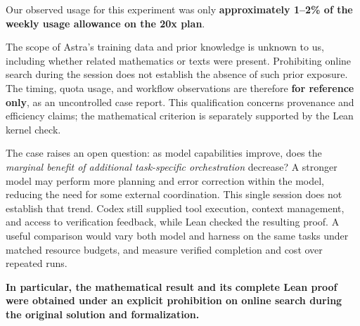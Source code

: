 \documentclass[11pt,a4paper]{article}
\numberwithin{equation}{section}
\theoremstyle{remark}
\begin{document}
Our observed usage for this experiment was only \textbf{approximately
1--2\% of the weekly usage allowance on the 20x plan}.

The scope of Astra's training data and prior knowledge is unknown to us,
including whether related mathematics or texts were present. Prohibiting
online search during the session does not establish the absence of such
prior exposure. The timing, quota usage, and workflow observations are therefore
\textbf{for reference only}, as an uncontrolled case report. This
qualification concerns provenance and efficiency claims; the mathematical
criterion is separately supported by the Lean kernel check.

The case raises an open question: as model capabilities improve, does the
\emph{marginal benefit of additional task-specific orchestration} decrease?
A stronger model may perform more planning and error correction within
the model, reducing the need for some external coordination. This single
session does not establish that trend. Codex still supplied tool execution,
context management, and access to verification feedback, while Lean checked
the resulting proof. A useful comparison would vary both model and harness
on the same tasks under matched resource budgets, and measure verified
completion and cost over repeated runs.

\textbf{In particular, the mathematical result and its complete Lean proof
were obtained under an explicit prohibition on online search during the
original solution and formalization.}
\end{document}
